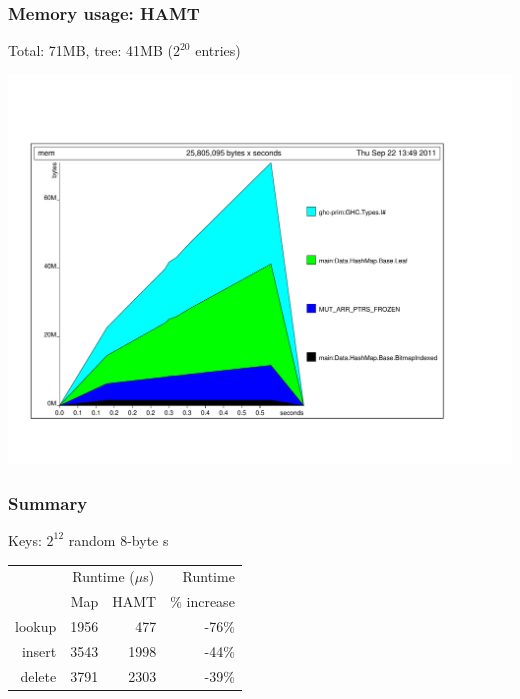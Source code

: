 \documentclass[xetex,mathserif,serif]{beamer}
\newcommand{\code}[1]{\mbox{\texttt{\small{\color{CodeColor}{#1}}}}}
\begin{document}
\begin{frame}
  \frametitle{Memory usage: HAMT}

  Total: 71MB, tree: 41MB ($2^{20}$ \code{Int} entries)
  \begin{center}
  \includegraphics[angle=90,scale=0.3]{hamt-mem.pdf}
  \end{center}
\end{frame}

\begin{frame}
  \frametitle{Summary}
  Keys: $2^{12}$ random 8-byte \code{ByteString}s

  \bigskip
  \begin{center}
  \begin{tabular}{r|rrr}
                  & \multicolumn{2}{c}{Runtime ($\mu$s)} & Runtime \\
                  & Map & HAMT & \% increase \\
    \hline lookup & 1956 &  477 & -76\% \\
           insert & 3543 & 1998 & -44\% \\
           delete & 3791 & 2303 & -39\% \\
  \end{tabular}
  \end{center}
\end{frame}
\end{document}
